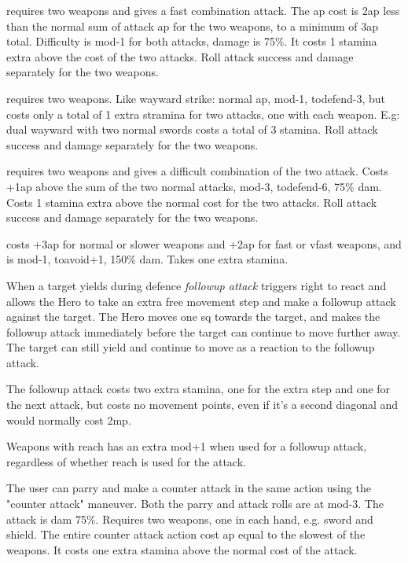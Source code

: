  requires two weapons and gives a fast combination attack. The ap cost is 2ap less than the normal sum of attack ap for the two weapons, to a minimum of 3ap total. Difficulty is mod-1 for both attacks, damage is 75\%. It costs 1 stamina extra above the cost of the two attacks.
Roll attack success and damage separately for the two weapons.


 requires two weapons. Like wayward strike: normal ap, mod-1, todefend-3, but costs only a total of 1 extra stramina for two attacks, one with each weapon. E.g: dual wayward with two normal swords costs a total of 3 stamina.
Roll attack success and damage separately for the two weapons.


 requires two weapons and gives a difficult combination of the two attack. Costs +1ap above the sum of the two normal attacks, mod-3, todefend-6, 75\% dam. Costs 1 stamina extra above the normal cost for the two attacks.
Roll attack success and damage separately for the two weapons.


 costs +3ap for normal or slower weapons and +2ap for fast or vfast weapons, and is mod-1, toavoid+1, 150\% dam. Takes one extra stamina.


 When a target yields during defence \emph{followup attack} triggers right to react and allows the Hero to take an extra free movement step and make a followup attack against the target. The Hero moves one sq towards the target, and makes the followup attack immediately before the target can continue to move further away. The target can still yield and continue to move as a reaction to the followup attack.

The followup attack costs two extra stamina, one for the extra step and one for the next attack, but costs no movement points, even if it's a second diagonal and would normally cost 2mp.

Weapons with reach has an extra mod+1 when used for a followup attack, regardless of whether reach is used for the attack.


 The user can parry and make a counter attack in the same action using the "counter attack" maneuver. Both the parry and attack rolls are at mod-3. The attack is dam 75\%. Requires two weapons, one in each hand, e.g. sword and shield. The entire counter attack action cost ap equal to the slowest of the weapons. It costs one extra stamina above the normal cost of the attack.


